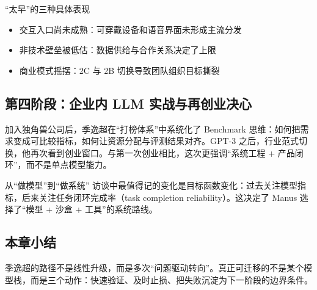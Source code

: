 \begin{warningbox}{“太早”的三种具体表现}
\begin{itemize}
    \item 交互入口尚未成熟：可穿戴设备和语音界面未形成主流分发
    \item 非技术壁垒被低估：数据供给与合作关系决定了上限
    \item 商业模式摇摆：2C 与 2B 切换导致团队组织目标撕裂
\end{itemize}
\end{warningbox}

\subsection{第四阶段：企业内 LLM 实战与再创业决心}

加入独角兽公司后，季逸超在“打榜体系”中系统化了 Benchmark 思维：如何把需求变成可比较指标，如何让资源分配与评测结果对齐。GPT-3 之后，行业范式切换，他再次看到创业窗口。与第一次创业相比，这次更强调“系统工程 + 产品闭环”，而不是单点模型能力。

\begin{importantbox}{从“做模型”到“做系统”}
访谈中最值得记的变化是目标函数变化：过去关注模型指标，后来关注任务闭环完成率（task completion reliability）。这决定了 Manus 选择了“模型 + 沙盒 + 工具”的系统路线。
\end{importantbox}

\subsection{本章小结}

季逸超的路径不是线性升级，而是多次“问题驱动转向”。真正可迁移的不是某个模型栈，而是三个动作：快速验证、及时止损、把失败沉淀为下一阶段的边界条件。


